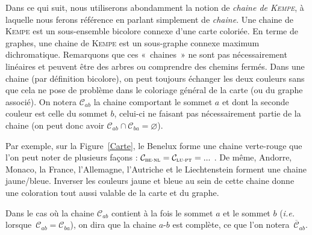 Dans ce qui suit, nous utiliserons abondamment la notion de \textit{chaine de \textsc{Kempe}}, à laquelle nous ferons référence en parlant simplement de \textit{chaine}. Une chaine de \textsc{Kempe} est un sous-ensemble bicolore connexe d'une carte coloriée. En terme de graphes, une chaine de \textsc{Kempe} est un sous-graphe connexe maximum dichromatique. Remarquons que ces «~chaines~» ne sont pas nécessairement linéaires et peuvent être des arbres ou comprendre des chemins fermés. Dans une chaine (par définition bicolore), on peut toujours échanger les deux couleurs sans que cela ne pose de problème dans le coloriage général de la carte (ou du graphe associé). On notera $\mathcal{C}_{ab}$ la chaine comportant le sommet $a$ et dont la seconde couleur est celle du sommet $b$, celui-ci ne faisant pas nécessairement partie de la chaine (on peut donc avoir $\mathcal{C}_{ab}\cap\mathcal{C}_{ba}=\varnothing$).

Par exemple, sur la Figure~\ref{Carte}, le Benelux forme une chaine verte-rouge que l'on peut noter de plusieurs façons : $\mathcal{C}_{\textsc{be}\cdot\textsc{nl}}=\mathcal{C}_{\textsc{lu}\cdot\textsc{pt}}=...$ . De même, Andorre, Monaco, la France, l'Allemagne, l'Autriche et le Liechtenstein forment une chaine jaune/bleue. Inverser les couleurs jaune et bleue au sein de cette chaine donne une coloration tout aussi valable de la carte et du graphe.

Dans le cas où la chaine $\mathcal{C}_{ab}$ contient à la fois le sommet $a$ et le sommet $b$ (\textit{i.e.} lorsque~$\mathcal{C}_{ab}=\mathcal{C}_{ba}$), on dira que la chaine $a$-$b$ est complète, ce que l'on notera~$\overline{\mathcal{C}}_{ab}$.
